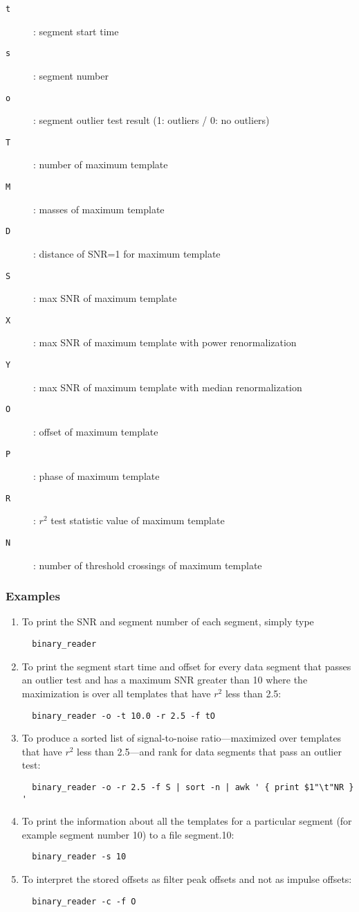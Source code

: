 \begin{description}
\item[\texttt{t}]: segment start time
\item[\texttt{s}]: segment number
\item[\texttt{o}]: segment outlier test result (1: outliers / 0: no outliers)
\item[\texttt{T}]: number of maximum template
\item[\texttt{M}]: masses of maximum template
\item[\texttt{D}]: distance of SNR=1 for maximum template
\item[\texttt{S}]: max SNR of maximum template
\item[\texttt{X}]: max SNR of maximum template with power renormalization
\item[\texttt{Y}]: max SNR of maximum template with median renormalization
\item[\texttt{O}]: offset of maximum template
\item[\texttt{P}]: phase of maximum template
\item[\texttt{R}]: $r^2$ test statistic value of maximum template
\item[\texttt{N}]: number of threshold crossings of maximum template
\end{description}

\subsubsection*{Examples}
\begin{enumerate}
\item To print the SNR and segment number of each segment, simply type
  \begin{verbatim}
  binary_reader
  \end{verbatim}
\item To print the segment start time and offset for every data segment that
  passes an outlier test and has a maximum SNR greater than 10 where the
  maximization is over all templates that have $r^2$ less than 2.5:
  \begin{verbatim}
  binary_reader -o -t 10.0 -r 2.5 -f tO
  \end{verbatim}
\item To produce a sorted list of signal-to-noise ratio---maximized over
  templates that have $r^2$ less than 2.5---and rank for data
  segments that pass an outlier test:
  \begin{verbatim}
  binary_reader -o -r 2.5 -f S | sort -n | awk ' { print $1"\t"NR } '
  \end{verbatim}%
\item To print the information about all the templates for a
  particular segment (for example segment number 10) to a file
  segment.10:
  \begin{verbatim}
  binary_reader -s 10
  \end{verbatim}
\item To interpret the stored offsets as filter peak offsets and not as impulse offsets:
  \begin{verbatim}
  binary_reader -c -f O
  \end{verbatim}
\end{enumerate}

